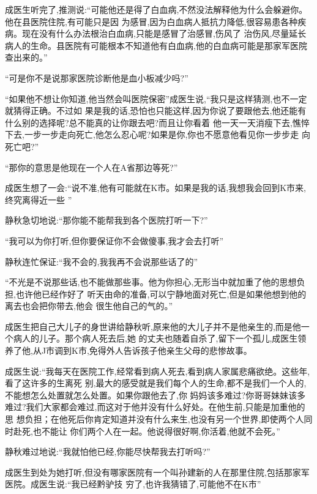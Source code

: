 ﻿\documentclass[12pt]{article}
\begin{document}
成医生听完了,推测说:``可能他还是得了白血病,不然没法解释他为什么会躲避你。他在县医院住院,有可能只是因
为感冒,因为白血病人抵抗力降低,很容易患各种疾病。现在没有什么办法根治白血病,只能是感冒了治感冒,伤风了
治伤风,尽量延长病人的生命。县医院有可能根本不知道他有白血病,他的白血病可能是那家军医院查出来的。''

``可是你不是说\myrule 那家医院诊断他是\myrule 血小板减少吗?''

``如果他不想让你知道,他当然会叫医院保密\myrule ''成医生说,``我只是这样猜测,也不一定就猜得正确。不过如
果是我的话,恐怕也只能这样,因为你说了要跟他去,他还能有什么别的选择呢?总不能真的让你跟去吧?而且让你看着
他一天一天消瘦下去,憔悴下去,一步一步走向\myrule 死亡,他怎么忍心呢?如果是你,你也不愿意他看见你一步步走
向\myrule 死亡吧?''

``那你的意思是他\myrule 现在一个人在A省那边\myrule 等\myrule 死?''

成医生想了一会:``说不准,他有可能就在K市。如果是我的话,我想我会回到K市来,终究\myrule 离得近一些
\myrule ''

静秋急切地说:``那\myrule 你能不能帮我到各个医院\myrule 打听一下?''

``我可以为你打听,但你\myrule 要保证你不会\myrule 做傻事,我才会去打听\myrule ''

静秋连忙保证:``我不会的,我\myrule 我\myrule 再不会说那些话了的\myrule ''

``不光是不说那些话,也不能做那些事。他为你担心,无形当中就加重了他的思想负担,也许他\myrule 已经作好了
\myrule 听天由命的准备,可以宁静地面对\myrule 死亡,但是如果他想到他的离去也会把你带\myrule 去,他会
\myrule 很生他自己的气的。''

成医生把自己大儿子的身世讲给静秋听,原来他的大儿子并不是他亲生的,而是他一个病人的儿子。那个病人死去后,她
的丈夫也随着自杀了,留下一个孤儿,成医生领养了他,从J市调到K市,免得外人告诉孩子他亲生父母的悲惨故事。

成医生说:``我每天在医院工作,经常看到病人\myrule 死去,看到病人家属悲痛欲绝。这些年,看了这许多的生离死
别,最大的感受就是我们每个人的生命,都不是我们一个人的,不能想怎么处置就怎么处置。如果你\myrule 跟他去了,你
妈妈该多难过?你哥哥妹妹该多难过?我们大家都会难过,而这对于他并没有什么好处。在他生前,只能是加重他的思
想负担；在他死后\myrule 你肯定知道并没有什么来生,也没有另一个世界,即使两个人同时赴死,也不能\myrule 让
你们两个人在一起。他说得很好啊,你活着,他就不会死。''

静秋难过地说:``我就怕\myrule 他已经\myrule ,你能尽快帮我去打听吗?''

成医生到处为她打听,但没有哪家医院有一个叫孙建新的人在那里住院,包括那家军医院。成医生说:``我已经黔驴技
穷了,也许我猜错了,可能他不在K市\myrule ''
\end{document}
